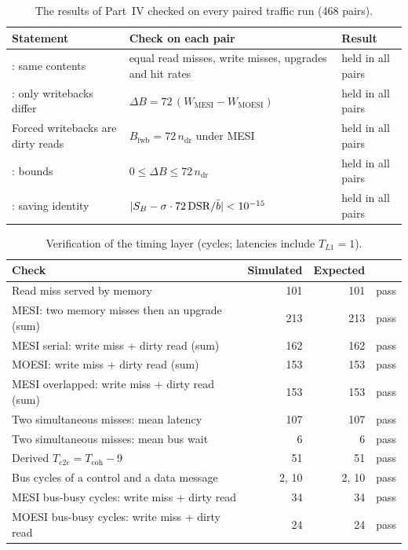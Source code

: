 \begin{table}[htbp]
\centering
\caption{The results of Part~IV checked on every paired traffic run (468 pairs).}
\label{tab:verify-identities}
\small
\begin{tabular}{@{}L{5.3cm} L{4.6cm} l@{}}
\toprule
Statement & Check on each pair & Result \\
\midrule
{}: same contents & equal read misses, write misses,
  upgrades and hit rates & held in all pairs \\
: only writebacks differ & $\Delta B = 72\,(W_{\mathrm{MESI}} - W_{\mathrm{MOESI}})$ & held in all pairs \\
Forced writebacks are dirty reads & $B_{\mathrm{fwb}} = 72\,n_{\mathrm{dr}}$ under MESI & held in all pairs \\
: bounds & $0 \le \Delta B \le 72\,n_{\mathrm{dr}}$ & held in all pairs \\
: saving identity & $|S_B - \sigma\cdot72\,\mathrm{DSR}/\bar b| < 10^{-15}$ & held in all pairs \\
\bottomrule
\end{tabular}
\end{table}

\begin{table}[htbp]
\centering
\caption{Verification of the timing layer (cycles; latencies include $T_{L1}=1$).}
\label{tab:verify-timing}
\small
\begin{tabular}{@{}L{7.0cm} r r l@{}}
\toprule
Check & Simulated & Expected & \\
\midrule
Read miss served by memory & 101 & 101 & pass \\
MESI: two memory misses then an upgrade (sum) & 213 & 213 & pass \\
MESI serial: write miss + dirty read (sum) & 162 & 162 & pass \\
MOESI: write miss + dirty read (sum) & 153 & 153 & pass \\
MESI overlapped: write miss + dirty read (sum) & 153 & 153 & pass \\
Two simultaneous misses: mean latency & 107 & 107 & pass \\
Two simultaneous misses: mean bus wait & 6 & 6 & pass \\
Derived $T_{\mathrm{c2c}} = T_{\mathrm{coh}} - 9$ & 51 & 51 & pass \\
Bus cycles of a control and a data message & 2, 10 & 2, 10 & pass \\
MESI bus-busy cycles: write miss + dirty read & 34 & 34 & pass \\
MOESI bus-busy cycles: write miss + dirty read & 24 & 24 & pass \\
\bottomrule
\end{tabular}
\end{table}

